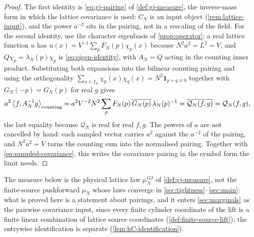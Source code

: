 \begin{proof}
The first identity is \eqref{eq:gj-pairing} of \cref{def:gj-measure}, the
inverse-mass form in which the lattice covariance is used: $C_N$ is an input
object (\cref{rem:lattice-input}), and the power $a^{-2}$ sits in the pairing,
not in a rescaling of the field. For the second identity, use the
character eigenbasis of \cref{prop:operator}: a real lattice function $u$ has
$u(x)=V^{-1}\sum_pF_N(p)\chi_p(x)$ because $N^2a^2=L^2=V$, and
$Q\chi_p=\lambda_N(p)\chi_p$ is \eqref{eq:eigen-identity}, with $A_N=Q$ acting
in the counting inner product. Substituting both expansions into the
bilinear counting pairing and using the orthogonality
$\sum_{x\in I_N}\chi_p(x)\chi_q(x)=N^2\mathbf 1_{p+q\equiv0}$ together with
$G_N(-p)=\overline{G_N(p)}$ for real $g$ gives
\[
  a^2\left\langle f, A_N^{-1}g \right\rangle_{\mathrm{counting}}
  =a^2V^{-2}N^2\sum_pF_N(p)\,\overline{G_N(p)}\,\lambda_N(p)^{-1}
  =\overline{\mathcal Q_N(f,g)}=\mathcal Q_N(f,g),
\]
the last equality because $\mathcal Q_N$ is real for real $f,g$. The powers of
$a$ are not cancelled by hand: each sampled vector carries $a^2$ against the
$a^{-2}$ of the pairing, and $N^2a^2=V$ turns the counting sum into the
normalised pairing. Together with \eqref{eq:sampled-covariance}, this writes the
covariance pairing in the symbol form the limit needs.
\end{proof}

The measure below is the physical lattice law $\mu^{\mathrm{GJ}}_N$ of
\cref{def:gj-measure}, not the finite-source pushforward $\mu_N$ whose laws
converge in \cref{sec:tightness}--\cref{sec:main}: what is proved here is a
statement about pairings, and it enters \cref{sec:marginals} as the pairwise
covariance input, since every finite cylinder coordinate of the lift is a finite
linear combination of lattice source coordinates (\cref{def:finite-source-lift});
the entrywise identification is separate (\cref{lem:hC-identification}).

